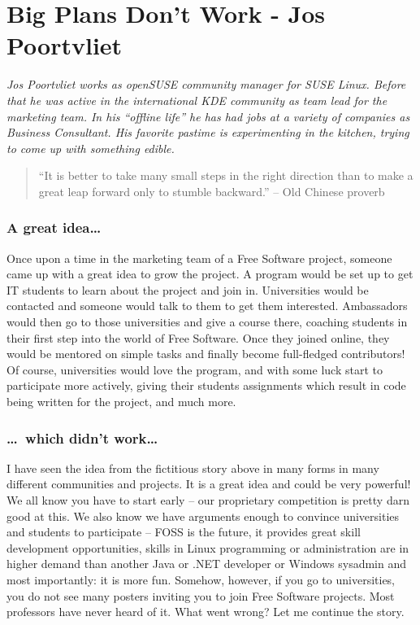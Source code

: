 \chapter{Big Plans Don't Work - Jos Poortvliet}

\textit{Jos Poortvliet works as openSUSE community manager for SUSE Linux.
Before that he was active in the international KDE community as team lead for
the marketing team. In his ``offline life'' he has had jobs at a variety of
companies as Business Consultant. His favorite pastime is experimenting in the
kitchen, trying to come up with something edible.}

\begin{quote}``It is better to take many small steps in the right direction than
to make a great leap forward only to stumble backward.'' -- Old Chinese
proverb\end{quote}

\subsection*{A great idea\dots}
Once upon a time in the marketing team of a Free Software project, someone came
up with a great idea to grow the project. A program would be set up to get IT
students to learn about the project and join in. Universities would be contacted
and someone would talk to them to get them interested. Ambassadors would then go
to those universities and give a course there, coaching students in their first
step into the world of Free Software. Once they joined online, they would be
mentored on simple tasks and finally become full-fledged contributors! Of
course, universities would love the program, and with some luck start to
participate more actively, giving their students assignments which result in
code being written for the project, and much more.

\subsection*{\dots\ which didn't work\dots}
I have seen the idea from the fictitious story above in many forms in many
different communities and projects. It is a great idea and could be very
powerful! We all know you have to start early -- our proprietary competition is
pretty darn good at this. We also know we have arguments enough to convince
universities and students to participate -- FOSS is the future, it provides
great skill development opportunities, skills in Linux programming or
administration are in higher demand than another Java or .NET developer or
Windows sysadmin and most importantly: it is more fun. Somehow, however, if you go
to universities, you do not see many posters inviting you to join Free Software
projects. Most professors have never heard of it. What went wrong? Let me
continue the story.

